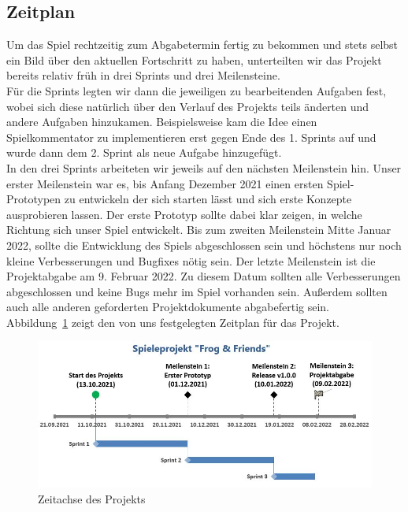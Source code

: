 \subsection{Zeitplan}

Um das Spiel rechtzeitig zum Abgabetermin fertig zu bekommen und stets selbst ein Bild über den aktuellen Fortschritt zu haben, unterteilten wir das Projekt bereits relativ früh in drei Sprints und drei Meilensteine.\\

Für die Sprints legten wir dann die jeweiligen zu bearbeitenden Aufgaben fest, wobei sich diese natürlich über den Verlauf des Projekts teils änderten und andere Aufgaben hinzukamen. Beispielsweise kam die Idee einen Spielkommentator zu implementieren erst gegen Ende des 1. Sprints auf und wurde dann dem 2. Sprint als neue Aufgabe hinzugefügt.\\

In den drei Sprints arbeiteten wir jeweils auf den nächsten Meilenstein hin. Unser erster Meilenstein war es, bis Anfang Dezember 2021 einen ersten Spiel-Prototypen zu entwickeln der sich starten lässt und sich erste Konzepte ausprobieren lassen. Der erste Prototyp sollte dabei klar zeigen, in welche Richtung sich unser Spiel entwickelt. Bis zum zweiten Meilenstein Mitte Januar 2022, sollte die Entwicklung des Spiels abgeschlossen sein und höchstens nur noch kleine Verbesserungen und Bugfixes nötig sein. Der letzte Meilenstein ist die Projektabgabe am 9. Februar 2022. Zu diesem Datum sollten alle Verbesserungen abgeschlossen und keine Bugs mehr im Spiel vorhanden sein. Außerdem sollten auch alle anderen geforderten Projektdokumente abgabefertig sein.\\

Abbildung~\ref{fig:timeline} zeigt den von uns festgelegten Zeitplan für das Projekt.\\

\begin{figure}[th]
\centering
\includegraphics[width=120mm]{Figures/timeline.jpg}
\decoRule
\caption[Zeitachse des Projekts]{Zeitachse des Projekts}
\label{fig:timeline}
\end{figure}

